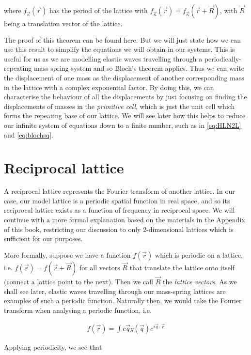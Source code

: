 where $f_{\vec{\kappa}}(\vec{r})$ has the period of the lattice with
$f_{\vec{\kappa}}(\vec{r})=f_{\vec{\kappa}}(\vec{r}+\vec{R})$, with $\vec{R}$ being a
translation vector of the lattice.

The proof of this theorem can be found here.\cite{kittel} But we will just
state how we can use this result to simplify the equations we will obtain in
our systems. This is useful for us as we are modelling elastic waves travelling
through a periodically-repeating mass-spring system and so Bloch's theorem
applies. Thus we can write the displacement of one mass as the displacement of
another corresponding mass in the lattice with a complex exponential factor. By
doing this, we can characterise the behaviour of all the displacements by just
focusing on finding the displacements of masses in the \textit{primitive cell},
which is just the unit cell which forms the repeating base of our lattice. We
will see later how this helps to reduce our infinite system of equations down
to a finite number, such as in \eqref{eq:HLN2L} and \eqref{eq:blochsq}.

\section{Reciprocal lattice}
\label{reclatbg}
A reciprocal lattice represents the Fourier transform of another lattice. In
our case, our model lattice is a periodic spatial function in real space, and
so its reciprocal lattice exists as a function of frequency in reciprocal
space.  We will continue with a more formal explanation based on the materials
in the Appendix of this book,\cite{moldinglight} restricting our discussion to
only 2-dimensional lattices which is sufficient for our purposes.

More formally, suppose we have a function $f(\vec{r})$ which is periodic on a
lattice, i.e. $f(\vec{r})=f(\vec{r}+\vec{R})$ for all vectors $\vec{R}$
that translate the lattice onto itself (connect a lattice point to the next).
Then we call $\vec{R}$ the \textit{lattice vectors}. As we shall see later,
elastic waves travelling through our mass-spring lattices are examples of such
a periodic function. Naturally then, we would take the Fourier transform when analysing a periodic function, i.e.

\begin{align}
  f(\vec{r})=\int c\vec{q}g(\vec{q})e^{i\vec{q}\cdot\vec{r}}
\label{eq:fg}
\end{align}

Applying periodicity, we see that

